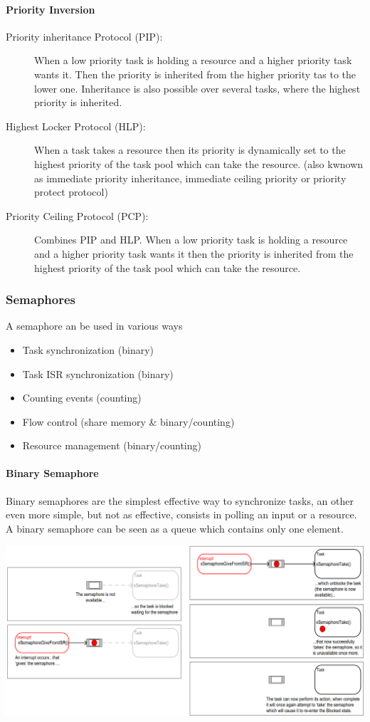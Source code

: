 \paragraph{Priority Inversion}
\begin{description}
	\item[Priority inheritance Protocol (PIP):] When a low priority task is holding a resource and a higher priority task wants it.
	      Then the priority is inherited from the higher priority tas to the lower one.
	      Inheritance is also possible over several tasks, where the highest priority is inherited.
	\item[Highest Locker Protocol (HLP):] When a task takes a resource then its priority is dynamically set to the highest priority of the task pool which can take the resource.
	      (also kwnown as immediate priority inheritance, immediate ceiling priority or priority protect protocol)
	\item[Priority Ceiling Protocol (PCP):] Combines PIP and HLP.
	      When a low priority task is holding a resource and a higher priority task wants it then the priority is inherited from the highest priority of the task pool which can take the resource.
\end{description}

\subsubsection{Semaphores}
A semaphore an be used in various ways
\begin{itemize}
	\item Task synchronization (binary)
	\item Task ISR synchronization (binary)
	\item Counting events (counting)
	\item Flow control (share memory \& binary/counting)
	\item Resource management (binary/counting)
\end{itemize}

\paragraph{Binary Semaphore}
Binary semaphores are the simplest effective way to synchronize tasks, an other even more simple, but not as effective, consists in polling an input or a resource.
A binary semaphore can be seen as a queue which contains only one element.

\includegraphics[width=\textwidth]{images/Concurrency/binary_semaphore.png}

